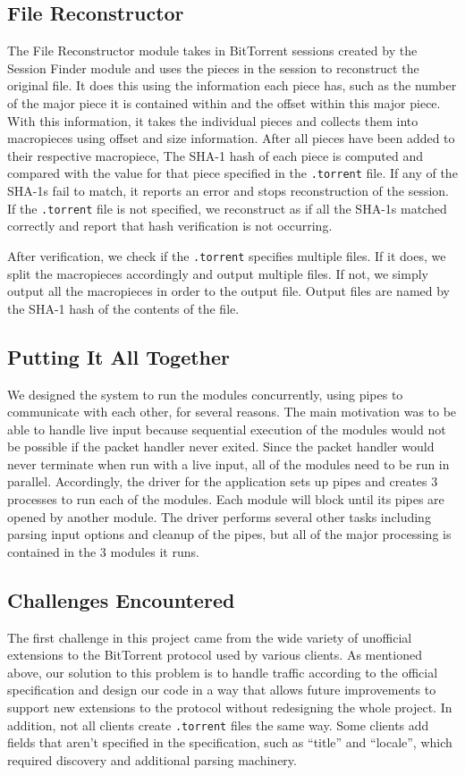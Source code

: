 \documentclass{acm_proc_article-sp}
\begin{document}
\subsection{File Reconstructor}
The File Reconstructor module takes in BitTorrent sessions created by the
Session Finder module and uses the pieces in the session to reconstruct the
original file. It does this using the information each piece has, such as the
number of the major piece it is contained within and the offset within this
major piece. With this information, it takes the individual pieces and
collects them into macropieces using offset and size information. After all
pieces have been added to their respective macropiece, The SHA-1 hash of each
piece is computed and compared with the value for that piece specified in the
\texttt{.torrent} file. If any of the SHA-1s fail to match, it reports an error
and stops reconstruction of the session. If the \texttt{.torrent} file is not
specified, we reconstruct as if all the SHA-1s matched correctly and report
that hash verification is not occurring.

After verification, we check if the \texttt{.torrent} specifies multiple files.
If it does, we split the macropieces accordingly and output multiple files. If
not, we simply output all the macropieces in order to the output file. Output
files are named by the SHA-1 hash of the contents of the file.

\subsection{Putting It All Together}
We designed the system to run the modules concurrently, using pipes to
communicate with each other, for several reasons. The main motivation was to be
able to handle live input because sequential execution of the modules would not
be possible if the packet handler never exited. Since the packet handler would
never terminate when run with a live input, all of the modules need to be run in
parallel. Accordingly, the driver for the application sets up pipes and creates
3 processes to run each of the modules. Each module will block until its pipes
are opened by another module. The driver performs several other tasks including
parsing input options and cleanup of the pipes, but all of the major processing
is contained in the 3 modules it runs.

\subsection{Challenges Encountered}
The first challenge in this project came from the wide variety of unofficial
extensions to the BitTorrent protocol used by various clients. As mentioned
above, our solution to this problem is to handle traffic according to the
official specification and design our code in a way that allows future
improvements to support new extensions to the protocol without redesigning the
whole project.  In addition, not all clients create \texttt{.torrent} files the
same way.  Some clients add fields that aren't specified in the specification,
such as ``title'' and ``locale'', which required discovery and additional
parsing machinery.
\end{document}
